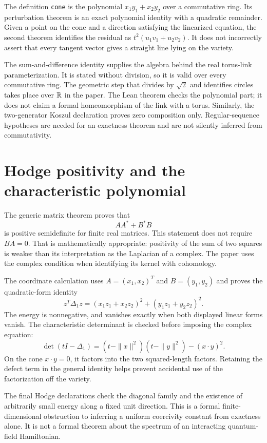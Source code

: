 The definition \texttt{cone} is the polynomial
$x_1y_1+x_2y_2$ over a commutative ring. Its perturbation theorem is an exact
polynomial identity with a quadratic remainder. Given a point on the cone
and a direction satisfying the linearized equation, the second theorem
identifies the residual as $t^2(u_1v_1+u_2v_2)$. It does not incorrectly
assert that every tangent vector gives a straight line lying on the
variety.

The sum-and-difference identity supplies the algebra behind the real
torus-link parameterization. It is stated without division, so it is valid
over every commutative ring. The geometric step that divides by $\sqrt2$ and
identifies circles takes place over $\mathbb{R}$ in the paper. The Lean theorem
checks the polynomial part; it does not claim a formal homeomorphism of the
link with a torus. Similarly, the two-generator Koszul declaration proves
zero composition only. Regular-sequence hypotheses are needed for an
exactness theorem and are not silently inferred from commutativity.

\section{Hodge positivity and the characteristic polynomial}

The generic matrix theorem proves that
\[
 AA^*+B^*B
\]
is positive semidefinite for finite real matrices. This statement does not
require $BA=0$. That is mathematically appropriate: positivity of the sum of
two squares is weaker than its interpretation as the Laplacian of a
complex. The paper uses the complex condition when identifying its kernel
with cohomology.

The coordinate calculation uses $A=(x_1,x_2)^T$ and
$B=(y_1,y_2)$ and proves the quadratic-form identity
\[
 z^T\Delta_1z=(x_1z_1+x_2z_2)^2+(y_1z_1+y_2z_2)^2.
\]
The energy is nonnegative, and vanishes exactly when both displayed linear
forms vanish. The characteristic determinant is checked before imposing
the complex equation:
\[
 \det(tI-\Delta_1)
 =(t-\|x\|^2)(t-\|y\|^2)-(x\cdot y)^2.
\]
On the cone $x\cdot y=0$, it factors into the two squared-length factors.
Retaining the defect term in the general identity helps prevent accidental
use of the factorization off the variety.

The final Hodge declarations check the diagonal family and the existence of
arbitrarily small energy along a fixed unit direction. This is a formal
finite-dimensional obstruction to inferring a uniform coercivity constant
from exactness alone. It is not a formal theorem about the spectrum of an
interacting quantum-field Hamiltonian.

